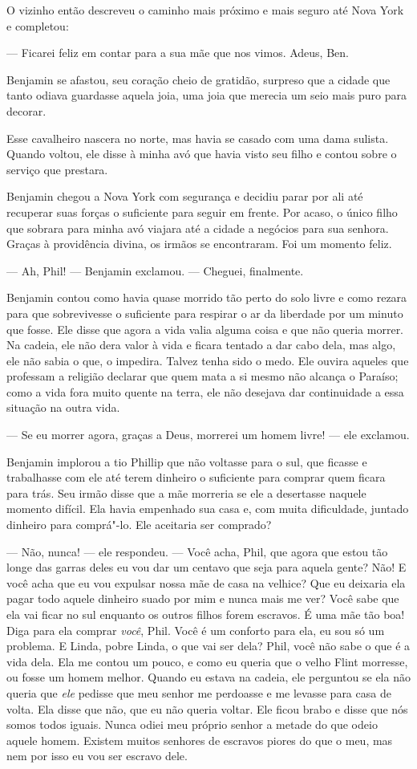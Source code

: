 O vizinho então descreveu o caminho mais próximo e mais seguro até Nova
York e completou:

--- Ficarei feliz em contar para a sua mãe que nos vimos. Adeus, Ben.

Benjamin se afastou, seu coração cheio
de gratidão, surpreso que a cidade que tanto odiava guardasse aquela
joia, uma joia que merecia um seio mais puro para decorar.

Esse cavalheiro nascera no norte, mas
havia se casado com uma dama sulista. Quando voltou, ele disse à minha
avó que havia visto seu filho e contou sobre o serviço que prestara.

Benjamin chegou a Nova York com
segurança e decidiu parar por ali até recuperar suas forças o suficiente
para seguir em frente. Por acaso, o único filho que sobrara para minha
avó viajara até a cidade a negócios para sua senhora. Graças à
providência divina, os irmãos se encontraram. Foi um momento feliz.

--- Ah, Phil! --- Benjamin exclamou. --- Cheguei, finalmente.

Benjamin contou como havia quase morrido tão perto do solo livre e como
rezara para que sobrevivesse o suficiente para respirar o ar da
liberdade por um minuto que fosse. Ele disse que agora a vida valia
alguma coisa e que não queria morrer. Na cadeia, ele não dera valor à
vida e ficara tentado a dar cabo dela, mas algo, ele não sabia o que, o
impedira. Talvez tenha sido o medo. Ele ouvira aqueles que professam a
religião declarar que quem mata a si mesmo não alcança o Paraíso; como a
vida fora muito quente na terra, ele não desejava dar continuidade a
essa situação na outra vida.

--- Se eu morrer agora, graças a Deus, morrerei um homem livre! --- ele
exclamou.

Benjamin implorou a tio Phillip que não
voltasse para o sul, que ficasse e trabalhasse com ele até terem
dinheiro o suficiente para comprar quem ficara para trás. Seu irmão
disse que a mãe morreria se ele a desertasse naquele momento difícil.
Ela havia empenhado sua casa e, com muita dificuldade, juntado dinheiro
para comprá"-lo. Ele aceitaria ser comprado?

--- Não, nunca! --- ele respondeu. ---
Você acha, Phil, que agora que estou tão longe das garras deles eu vou
dar um centavo que seja para aquela gente? Não! E você acha que eu vou
expulsar nossa mãe de casa na velhice? Que eu deixaria ela pagar todo
aquele dinheiro suado por mim e nunca mais me ver? Você sabe que ela vai
ficar no sul enquanto os outros filhos forem escravos. É uma mãe tão
boa! Diga para ela comprar \emph{você}, Phil. Você é um conforto para
ela, eu sou só um problema. E Linda, pobre Linda, o que vai ser dela?
Phil, você não sabe o que é a vida dela. Ela me contou um pouco, e como
eu queria que o velho Flint morresse, ou fosse um homem melhor. Quando
eu estava na cadeia, ele perguntou se ela não queria que \emph{ele}
pedisse que meu senhor me perdoasse e me levasse para casa de volta. Ela
disse que não, que eu não queria voltar. Ele ficou brabo e disse que nós
somos todos iguais. Nunca odiei meu próprio senhor a metade do que odeio
aquele homem. Existem muitos senhores de escravos piores do que o meu,
mas nem por isso eu vou ser escravo dele.

